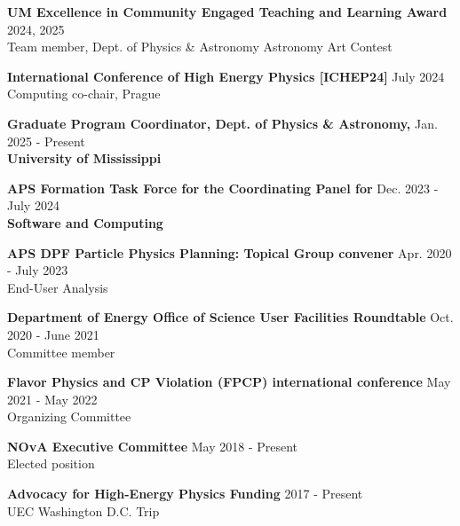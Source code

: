 \documentclass[margin, line]{res}
\renewcommand{\em}{\upshape\sffamily}
\begin{document}
\begin{resume}
{\bf UM Excellence in Community Engaged Teaching and Learning Award} \hfill {2024, 2025}\\
{\em Team member, Dept. of Physics \& Astronomy Astronomy Art Contest}\\
\vspace{-.3cm}

{\bf International Conference of High Energy Physics [ICHEP24]} \hfill {July 2024}\\
{\em Computing co-chair, Prague}\\
\vspace{-.3cm}

{\bf Graduate Program Coordinator, Dept. of Physics \& Astronomy,} \hfill {Jan. 2025 - Present}\\
{\bf University of Mississippi}\\
\vspace{-.3cm}

{\bf APS Formation Task Force for the Coordinating Panel for} \hfill {Dec. 2023 - July 2024}\\
{\bf Software and Computing}\\
\vspace{-.3cm}

{\bf APS DPF Particle Physics Planning: Topical Group convener} \hfill {Apr. 2020 - July 2023}\\
{\em End-User Analysis}\\
\vspace{-.3cm}

{\bf Department of Energy Office of Science User Facilities Roundtable} \hfill {Oct. 2020 - June 2021}\\
{\em Committee member}\\
\vspace{-.3cm}

{\bf Flavor Physics and CP Violation (FPCP) international conference} \hfill {May 2021 - May 2022}\\
{\em Organizing Committee}\\
\vspace{-.3cm}

{\bf NOvA Executive Committee} \hfill {May 2018 - Present}\\
{\em Elected position}\\
\vspace{-.3cm}

{\bf Advocacy for High-Energy Physics Funding} \hfill {2017 - Present}\\
{\em UEC Washington D.C. Trip}\\
\vspace{-.3cm}


\end{resume}
\end{document}

